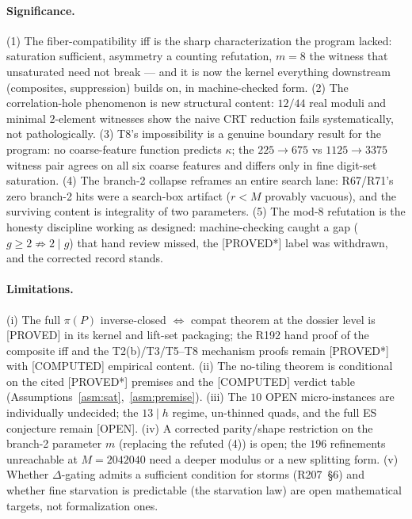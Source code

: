 \documentclass[11pt,a4paper]{article}
\theoremstyle{definition}
\begin{document}
\paragraph{Significance.}
(1) The fiber-compatibility iff is the sharp characterization the
program lacked: saturation sufficient, asymmetry a counting refutation,
$m=8$ the witness that unsaturated need not break --- and it is now the
kernel everything downstream (composites, suppression) builds on, in
machine-checked form. (2) The correlation-hole phenomenon is new
structural content: $12/44$ real moduli and minimal $2$-element
witnesses show the naive CRT reduction fails systematically, not
pathologically. (3) T8's impossibility is a genuine boundary result for
the program: no coarse-feature function predicts $\kappa$; the
$225\to675$ vs $1125\to3375$ witness pair agrees on all six coarse
features and differs only in fine digit-set saturation. (4) The branch-2
collapse reframes an entire search lane: R67/R71's zero branch-2 hits
were a search-box artifact ($r<M$ provably vacuous), and the surviving
content is integrality of two parameters. (5) The mod-$8$ refutation is
the honesty discipline working as designed: machine-checking caught a
gap ($g\ge2\not\Rightarrow2\mid g$) that hand review missed, the
[PROVED*] label was withdrawn, and the corrected record stands.

\paragraph{Limitations.}
(i) The full $\pi(P)$ inverse-closed $\iff$ compat theorem at the
dossier level is [PROVED] in its kernel and lift-set packaging; the
R192 hand proof of the composite iff and the T2(b)/T3/T5--T8 mechanism
proofs remain [PROVED*] with [COMPUTED] empirical content. (ii) The
no-tiling theorem is conditional on the cited [PROVED*] premises and the
[COMPUTED] verdict table (Assumptions~\ref{asm:sat},~\ref{asm:premise}).
(iii) The $10$ OPEN micro-instances are individually undecided; the
$13\mid h$ regime, un-thinned quads, and the full ES conjecture remain
[OPEN]. (iv) A corrected parity/shape restriction on the branch-2
parameter $m$ (replacing the refuted (4)) is open; the $196$ refinements
unreachable at $M=2042040$ need a deeper modulus or a new splitting
form. (v) Whether $\Delta$-gating admits a sufficient condition for
storms (R207~\S6) and whether fine starvation is predictable (the
starvation law) are open mathematical targets, not formalization ones.

\end{document}
